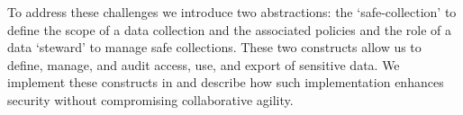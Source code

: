 To address these challenges we introduce two abstractions:
the `safe-collection' to define the scope of a data collection
and the associated policies and the role of a data `steward'
to manage safe collections. These two constructs allow us
to define, manage, and audit access, use, and export of
sensitive data.  We implement these constructs in \NAME and
describe how such implementation enhances security without compromising collaborative agility.


%
